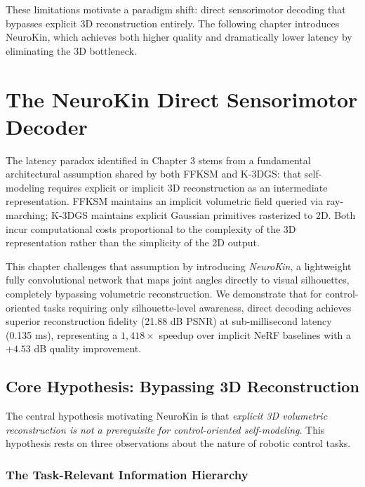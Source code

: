 \documentclass[12pt,a4paper,oneside]{report}
\begin{document}
These limitations motivate a paradigm shift: direct sensorimotor decoding that bypasses explicit 3D reconstruction entirely. The following chapter introduces NeuroKin, which achieves both higher quality and dramatically lower latency by eliminating the 3D bottleneck.









\chapter{The NeuroKin Direct Sensorimotor Decoder}

The latency paradox identified in Chapter 3 stems from a fundamental architectural assumption shared by both FFKSM and K-3DGS: that self-modeling requires explicit or implicit 3D reconstruction as an intermediate representation. FFKSM maintains an implicit volumetric field queried via ray-marching; K-3DGS maintains explicit Gaussian primitives rasterized to 2D. Both incur computational costs proportional to the complexity of the 3D representation rather than the simplicity of the 2D output.

This chapter challenges that assumption by introducing \textit{NeuroKin}, a lightweight fully convolutional network that maps joint angles directly to visual silhouettes, completely bypassing volumetric reconstruction. We demonstrate that for control-oriented tasks requiring only silhouette-level awareness, direct decoding achieves superior reconstruction fidelity (21.88 dB PSNR) at sub-millisecond latency (0.135 ms), representing a $1,418\times$ speedup over implicit NeRF baselines with a $+4.53$ dB quality improvement.

\section{Core Hypothesis: Bypassing 3D Reconstruction}

The central hypothesis motivating NeuroKin is that \textit{explicit 3D volumetric reconstruction is not a prerequisite for control-oriented self-modeling}. This hypothesis rests on three observations about the nature of robotic control tasks.

\subsection{The Task-Relevant Information Hierarchy}
\end{document}
